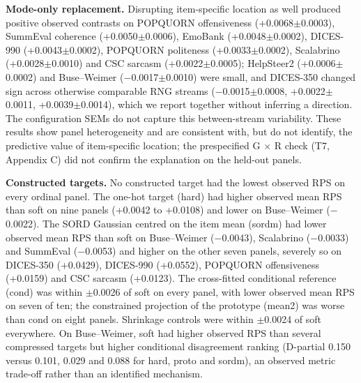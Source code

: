 \documentclass[10pt]{article}
\begin{document}
\textbf{Mode-only replacement.} Disrupting item-specific location as well produced positive observed contrasts on POPQUORN offensiveness (+0.0068$\pm$0.0003), SummEval coherence (+0.0050$\pm$0.0006), EmoBank (+0.0048$\pm$0.0002), DICES-990 (+0.0043$\pm$0.0002), POPQUORN politeness (+0.0033$\pm$0.0002), Scalabrino (+0.0028$\pm$0.0010) and CSC sarcasm (+0.0022$\pm$0.0005); HelpSteer2 (+0.0006$\pm$0.0002) and Buse--Weimer ($-$0.0017$\pm$0.0010) were small, and DICES-350 changed sign across otherwise comparable RNG streams ($-$0.0015$\pm$0.0008, +0.0022$\pm$0.0011, +0.0039$\pm$0.0014), which we report together without inferring a direction. The configuration SEMs do not capture this between-stream variability. These results show panel heterogeneity and are consistent with, but do not identify, the predictive value of item-specific location; the prespecified G $\times$ R check (T7, Appendix C) did not confirm the explanation on the held-out panels.

\textbf{Constructed targets.} No constructed target had the lowest observed RPS on every ordinal panel. The one-hot target (hard) had higher observed mean RPS than soft on nine panels (+0.0042 to +0.0108) and lower on Buse--Weimer ($-$0.0022). The SORD Gaussian centred on the item mean (sordm) had lower observed mean RPS than soft on Buse--Weimer ($-$0.0043), Scalabrino ($-$0.0033) and SummEval ($-$0.0053) and higher on the other seven panels, severely so on DICES-350 (+0.0429), DICES-990 (+0.0552), POPQUORN offensiveness (+0.0159) and CSC sarcasm (+0.0123). The cross-fitted conditional reference (cond) was within $\pm$0.0026 of soft on every panel, with lower observed mean RPS on seven of ten; the constrained projection of the prototype (mean2) was worse than cond on eight panels. Shrinkage controls were within $\pm$0.0024 of soft everywhere. On Buse--Weimer, soft had higher observed RPS than several compressed targets but higher conditional disagreement ranking (D-partial 0.150 versus 0.101, 0.029 and 0.088 for hard, proto and sordm), an observed metric trade-off rather than an identified mechanism.
\end{document}
